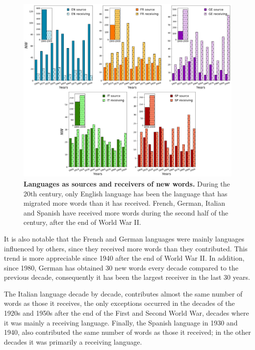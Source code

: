 \documentclass[10pt,letterpaper]{article} %
\begin{document}
\begin{figure}[!h]
	\begin{adjustwidth}{-1.2in}{0in}
	\includegraphics[scale=.35]{NW_OR.png}
	\caption{{\bf Languages ​​as sources and receivers of new words.} During the 20th century, only English language has been the language that has migrated more words than it has received. French, German, Italian and Spanish have received more words during the second half of the century, after the end of World War II.}
	\label{fig.NMW_OR}
	\end{adjustwidth}
\end{figure}

It is also notable that the French and German languages ​​were mainly
languages ​​influenced by others, since they received more words than
they contributed. This trend is more appreciable since 1940 after the end of
World War II. In addition, since 1980, German has obtained 30 new words every
decade compared to the previous decade, consequently it has been the largest
receiver in the last 30 years.

The Italian language decade by decade, contributes almost the same number of words as those it receives, the only exceptions occurred in the decades of the 1920s and 1950s after the end of the First and Second World War, decades where it was mainly a receiving language. Finally, the Spanish language in 1930 and 1940, also contributed the same number of words as those it received; in the other decades it was primarily a receiving language.
\end{document}
